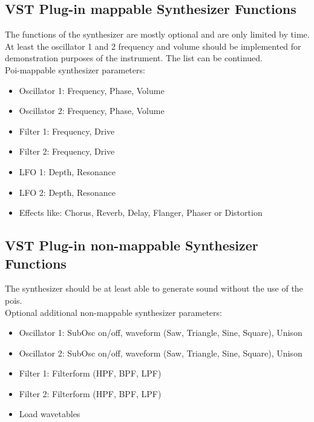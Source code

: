 \subsection{VST Plug-in mappable Synthesizer Functions}
\begin{description}
	\item The functions of the synthesizer are mostly optional and are only limited by time. At least the oscillator 1 and 2 frequency and volume should be implemented for demonstration purposes of the instrument. The list can be continued. \\ 
	Poi-mappable synthesizer parameters:
\end{description}
\begin{itemize}
	\item Oscillator 1: Frequency, Phase, Volume
	\item Oscillator 2: Frequency, Phase, Volume
	\item Filter 1: Frequency, Drive
	\item Filter 2: Frequency, Drive
	\item LFO 1: Depth, Resonance
	\item LFO 2: Depth, Resonance
	\item Effects like: Chorus, Reverb, Delay, Flanger, Phaser or Distortion
\end{itemize}	

\subsection{VST Plug-in non-mappable Synthesizer Functions}
\begin{description}
	\item The synthesizer should be at least able to generate sound without the use of the pois. \\
	Optional additional non-mappable synthesizer parameters:
\end{description}
\begin{itemize}
	\item Oscillator 1: SubOsc on/off, waveform (Saw, Triangle, Sine, Square), Unison
	\item Oscillator 2: SubOsc on/off, waveform (Saw, Triangle, Sine, Square), Unison
	\item Filter 1: Filterform (HPF, BPF, LPF)
	\item Filter 2: Filterform (HPF, BPF, LPF)
	\item Load wavetables
\end{itemize}